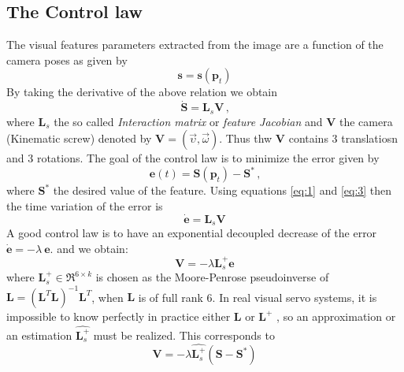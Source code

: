 \documentclass[a4paper,12pt]{article}
\begin{document}
\subsection{The Control law}
The visual features parameters extracted from the image are a function of the camera poses as given by
\begin{equation}
        \mathbf{s} = \mathbf{s}(\mathbf{p}_t)
        \label{eq:1}
\end{equation}
By taking the derivative of the above relation we obtain
\begin{equation}
        \dot{\mathbf{S}} = \mathbf{L}_s \mathbf{V} \,\text{,}
        \label{eq:2}
\end{equation}
where $\mathbf{L}_s$ the so called \textit{Interaction matrix} or \textit{feature Jacobian} and $\mathbf{V}$  the 
camera (Kinematic screw) denoted by $\mathbf{V} = \left( \vec{\upsilon}, \vec{\omega} \right)$. Thus thw $\mathbf{V}$ contains 3 translatiosn and 3 rotations. 
The goal of the control law is to minimize the error given by
\begin{equation}
        \mathbf{e}(t) = \mathbf{S}\left(  \mathbf{p}_t \right) -\mathbf{S}^{\ast} \,\text{,}
        \label{eq:3}
\end{equation}
where $\mathbf{S}^{\ast}$ the desired value of the feature.
Using equations \eqref{eq:1} and \eqref{eq:3} then the time variation of the error is
\begin{equation}
        \dot{\mathbf{e}} =  \mathbf{L}_s   \mathbf{V}
        \label{eq:4}
\end{equation}
A good control law is to have an exponential decoupled decrease of the error 
$\dot{\mathbf{e}} = - \lambda\ \mathbf{e}$. 
and we obtain:
\begin{equation}
        \mathbf{V}  =   -\lambda \mathbf{L}_s^+ \mathbf{e}
        \label{eq:4a}
\end{equation}
where $\mathbf{L}_s^+ \in \Re^{6 \times k}$
is  chosen  as  the  Moore-Penrose  pseudoinverse of 
$\mathbf{L}=\left( \mathbf{L}^T \mathbf{L} \right)^{-1} \mathbf{L}^T$, when 
$\mathbf{L}$ is of full rank  6.  
In  real  visual  servo  systems,  it  is  impossible  to  know  perfectly 
in practice either $\mathbf{L}$ or $\mathbf{L}^+$ , so an approximation or an
estimation  $\widehat{\mathbf{L}_s^+}$  must  be  realized.
This corresponds to
\begin{equation}
        \mathbf{V} = -\lambda \widehat{\mathbf{L}_s^+}\left(\mathbf{S}  -\mathbf{S}^{\ast} \right)
        \label{eq:5}
\end{equation}
\end{document}

